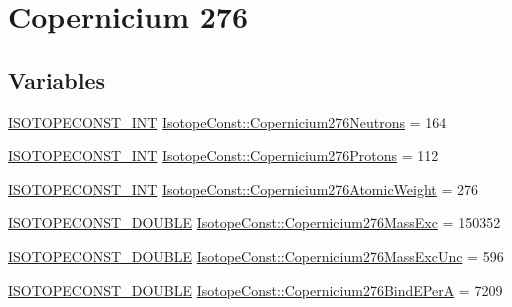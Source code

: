 \hypertarget{group___isotope_const-_copernicium-_cn276}{}\section{Copernicium 276}
\label{group___isotope_const-_copernicium-_cn276}
\subsection*{Variables}
\begin{DoxyCompactItemize}
\item 
\mbox{\hyperlink{group___isotope_const-_macros_ga5f18360b3e99483a35c32d789e62621c}{I\+S\+O\+T\+O\+P\+E\+C\+O\+N\+S\+T\+\_\+\+I\+NT}} \mbox{\hyperlink{group___isotope_const-_copernicium-_cn276_gab1c7b92f45347f6c6fd1dd6494112830}{Isotope\+Const\+::\+Copernicium276\+Neutrons}} = 164
\item 
\mbox{\hyperlink{group___isotope_const-_macros_ga5f18360b3e99483a35c32d789e62621c}{I\+S\+O\+T\+O\+P\+E\+C\+O\+N\+S\+T\+\_\+\+I\+NT}} \mbox{\hyperlink{group___isotope_const-_copernicium-_cn276_ga2774d389eaddfea3848cb1e6d8438a6d}{Isotope\+Const\+::\+Copernicium276\+Protons}} = 112
\item 
\mbox{\hyperlink{group___isotope_const-_macros_ga5f18360b3e99483a35c32d789e62621c}{I\+S\+O\+T\+O\+P\+E\+C\+O\+N\+S\+T\+\_\+\+I\+NT}} \mbox{\hyperlink{group___isotope_const-_copernicium-_cn276_gaf676889e48af736466f8b589e68af876}{Isotope\+Const\+::\+Copernicium276\+Atomic\+Weight}} = 276
\item 
\mbox{\hyperlink{group___isotope_const-_macros_ga8f45a7272ce02c0b4c65c44636ed719a}{I\+S\+O\+T\+O\+P\+E\+C\+O\+N\+S\+T\+\_\+\+D\+O\+U\+B\+LE}} \mbox{\hyperlink{group___isotope_const-_copernicium-_cn276_ga31f6eb869c8275b4da7ef0e4de7be1af}{Isotope\+Const\+::\+Copernicium276\+Mass\+Exc}} = 150352
\item 
\mbox{\hyperlink{group___isotope_const-_macros_ga8f45a7272ce02c0b4c65c44636ed719a}{I\+S\+O\+T\+O\+P\+E\+C\+O\+N\+S\+T\+\_\+\+D\+O\+U\+B\+LE}} \mbox{\hyperlink{group___isotope_const-_copernicium-_cn276_ga9d7d34b99f02303e60caa0454bf342fb}{Isotope\+Const\+::\+Copernicium276\+Mass\+Exc\+Unc}} = 596
\item 
\mbox{\hyperlink{group___isotope_const-_macros_ga8f45a7272ce02c0b4c65c44636ed719a}{I\+S\+O\+T\+O\+P\+E\+C\+O\+N\+S\+T\+\_\+\+D\+O\+U\+B\+LE}} \mbox{\hyperlink{group___isotope_const-_copernicium-_cn276_gac494a08f5bc907f1e72e7c3bcd3fa79c}{Isotope\+Const\+::\+Copernicium276\+Bind\+E\+PerA}} = 7209

\end{DoxyCompactItemize}
